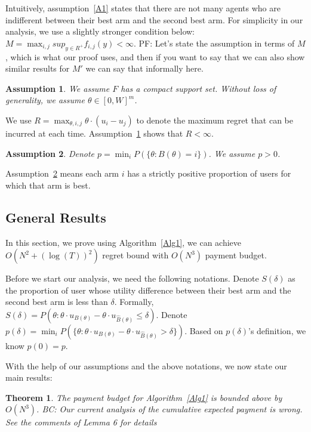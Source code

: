 \documentclass{article}
\newcommand{\bccomment}[1]{{\color{blue}BC: #1}}
\newcommand{\pfcomment}[1]{{\color{blue}PF: #1}}
\newtheorem{theorem}{Theorem}
\newtheorem{assumption}{Assumption}
\begin{document}
Intuitively, assumption~\ref{A1} states that there are not many agents who are indifferent between their best arm and the second best arm. For simplicity in our analysis, we use a slightly stronger condition below: $M=\max_{i,j}sup_{y\in R^{+}}f_{i,j}(y) <\infty$.  \pfcomment{Let's state the assumption in terms of $M$, which is what our proof uses, and then if you want to say that we can also show similar results for $M'$ we can say that informally here.}


\begin{assumption} We assume $F$ has a compact support set. Without loss of generality, we assume $\theta\in [0,W]^m$.
\label{A2}
\end{assumption}

We use $R = \max_{\theta, i,j} \theta \cdot (u_i - u_j)$ to denote the maximum regret that can be incurred at each time.  Assumption~\ref{A2} shows that $R<\infty$.

\begin{assumption}
Denote $p=\min_{i}P(\{\theta: B(\theta)=i\})$. We assume $p>0$.
\label{A3}
\end{assumption}

Assumption~\ref{A3} means each arm $i$ has a strictly positive proportion of users for which that arm is best. 


\subsection{General Results}

In this section, we prove using Algorithm~\ref{Alg1}, we can achieve $O(N^2+(\log(T))^2)$ regret bound with $O(N^3)$ payment budget.

Before we start our analysis, we need the following notations. Denote $S(\delta)$ as the proportion of user whose utility difference between their best arm and the second best arm is less than $\delta$. Formally, $S(\delta)=P(\theta: \theta \cdot u_{B(\theta)}-\theta\cdot u_{\hat{B}(\theta)}\leq \delta)$. Denote $p(\delta)=\min_{i}P(\{\theta:\theta\cdot u_{B(\theta)}-\theta\cdot u_{\hat{B}(\theta)}>\delta\})$. Based on $p(\delta)$'s definition, we know $p(0)=p$. 

With the help of our assumptions and the above notations, we now state our main results:

\begin{theorem}
The payment budget for Algorithm~\ref{Alg1} is bounded above by $O(N^3)$. \bccomment{Our current analysis of the cumulative expected payment is wrong. See the comments of Lemma 6 for details}
\label{rst:budget}
\end{theorem}
\end{document}
